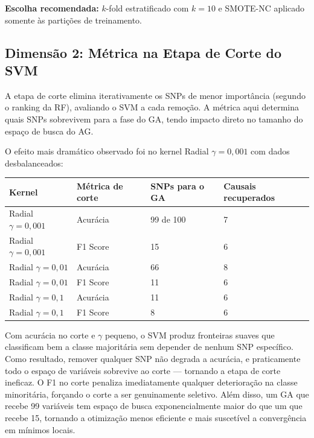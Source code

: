 \documentclass[12pt,a4paper]{article}
\newcommand{\novo}[1]{\textcolor{corNova}{#1}}
\renewcommand{\arraystretch}{1.3}
\begin{document}
\novo{\textbf{Escolha recomendada:} $k$-fold estratificado com $k = 10$ e SMOTE-NC aplicado somente às partições de treinamento.}

\subsection*{\novo{Dimensão 2: Métrica na Etapa de Corte do SVM}}

\novo{A etapa de corte elimina iterativamente os SNPs de menor importância (segundo o ranking da RF), avaliando o SVM a cada remoção. A métrica aqui determina quais SNPs sobrevivem para a fase do GA, tendo impacto direto no tamanho do espaço de busca do AG.}

\novo{O efeito mais dramático observado foi no kernel Radial $\gamma = 0{,}001$ com dados desbalanceados:}

\begin{center}
\footnotesize
\setlength{\tabcolsep}{4pt}
\renewcommand{\arraystretch}{1.4}
\begin{tabular}{L{4.0cm}|C{2.8cm}|C{2.8cm}|C{2.8cm}}
  \textbf{Kernel} & \textbf{Métrica de corte} & \textbf{SNPs para o GA} & \textbf{Causais recuperados} \\
  \hline
  Radial $\gamma = 0{,}001$ & Acurácia & 99 de 100 & 7 \\
  Radial $\gamma = 0{,}001$ & F1 Score  & 15 & 6 \\
  \hline
  Radial $\gamma = 0{,}01$ & Acurácia & 66 & 8 \\
  Radial $\gamma = 0{,}01$ & F1 Score  & 11 & 6 \\
  \hline
  Radial $\gamma = 0{,}1$ & Acurácia & 11 & 6 \\
  Radial $\gamma = 0{,}1$ & F1 Score  & 8 & 6 \\
\end{tabular}
\end{center}
\renewcommand{\arraystretch}{1.3}

\novo{Com acurácia no corte e $\gamma$ pequeno, o SVM produz fronteiras suaves que classificam bem a classe majoritária sem depender de nenhum SNP específico. Como resultado, remover qualquer SNP não degrada a acurácia, e praticamente todo o espaço de variáveis sobrevive ao corte --- tornando a etapa de corte ineficaz. O F1 no corte penaliza imediatamente qualquer deterioração na classe minoritária, forçando o corte a ser genuinamente seletivo. Além disso, um GA que recebe 99 variáveis tem espaço de busca exponencialmente maior do que um que recebe 15, tornando a otimização menos eficiente e mais suscetível a convergência em mínimos locais.}
\end{document}

